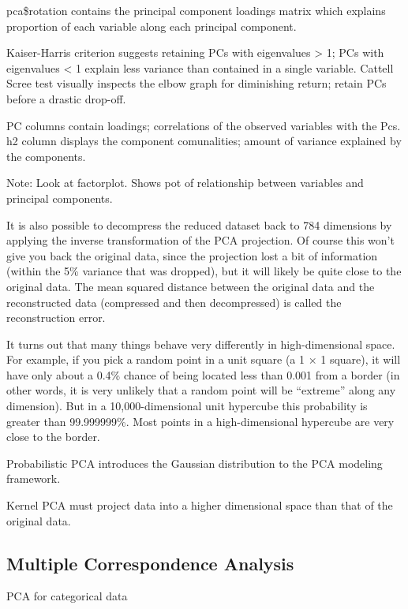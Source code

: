 \documentclass[]{book}
\begin{document}
pca\$rotation contains the principal component loadings matrix which explains proportion of each variable along each principal component.

Kaiser-Harris criterion suggests retaining PCs with eigenvalues \textgreater{} 1; PCs with eigenvalues \textless{} 1 explain less variance than contained in a single variable. Cattell Scree test visually inspects the elbow graph for diminishing return; retain PCs before a drastic drop-off.

PC columns contain loadings; correlations of the observed variables with the Pcs. h2 column displays the component comunalities; amount of variance explained by the components.

Note: Look at factorplot. Shows pot of relationship between variables and principal components.

It is also possible to decompress the reduced dataset back to 784 dimensions by applying the inverse transformation of the PCA projection. Of course this won't give you back the original data, since the projection lost a bit of information (within the 5\% variance that was dropped), but it will likely be quite close to the original data. The mean squared distance between the original data and the reconstructed data (compressed and then decompressed) is called the reconstruction error.

It turns out that many things behave very differently in high-dimensional space. For example, if you pick a random point in a unit square (a 1 × 1 square), it will have only about a 0.4\% chance of being located less than 0.001 from a border (in other words, it is very unlikely that a random point will be ``extreme'' along any dimension). But in a 10,000-dimensional unit hypercube this probability is greater than 99.999999\%. Most points in a high-dimensional hypercube are very close to the border.

Probabilistic PCA introduces the Gaussian distribution to the PCA modeling framework.

Kernel PCA must project data into a higher dimensional space than that of the original data.

\hypertarget{multiple-correspondence-analysis}{%
\subsection{Multiple Correspondence Analysis}\label{multiple-correspondence-analysis}}

PCA for categorical data
\end{document}
